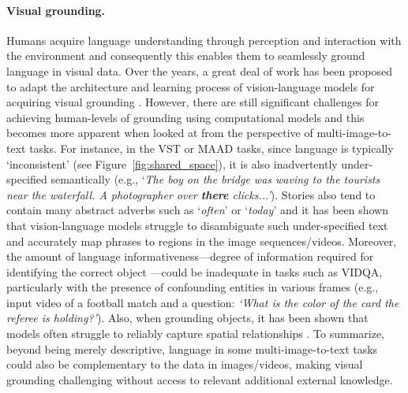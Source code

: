 \paragraph{Visual grounding.}
Humans acquire language understanding through perception and interaction with the environment \cite{vg0,lang_acquisition} and consequently this enables them to seamlessly ground language in visual data. Over the years, a great deal of work has been proposed to adapt the architecture and learning process of vision-language models for acquiring visual grounding \cite{vg1}. However, there are still significant challenges for achieving human-levels of grounding using computational models and this becomes more apparent when looked at from the perspective of multi-image-to-text tasks. For instance, in the \color{xkcdVividBlue}VST \color{black} or \color{xkcdVividBlue}MAAD \color{black} tasks, since language is typically `inconsistent' (see Figure~\ref{fig:shared_space}), it is also inadvertently under-specified semantically \cite{semantic_underspecification} (e.g., `\textit{The boy on the bridge was waving to the tourists near the waterfall. A photographer over \color{red}\textbf{there} \color{black} clicks...'}). Stories also tend to contain many abstract adverbs such as `\textit{often}' or `\textit{today}' and it has been shown that vision-language models struggle to disambiguate such under-specified text and accurately map phrases to regions in the image sequences/videos. Moreover, the amount of language informativeness---degree of information required for identifying the correct object \cite{vg2}---could be inadequate in tasks such as \color{xkcdVividBlue}VIDQA\color{black}, particularly with the presence of confounding entities in various frames (e.g., input video of a football match and a question: \textit{`What is the color of the card the referee is holding?'}). Also, when grounding objects, it has been shown that models often struggle to reliably capture spatial relationships \cite{vg3}. To summarize, beyond being merely descriptive, language in some multi-image-to-text tasks could also be complementary to the data in images/videos, making visual grounding challenging without access to relevant additional external knowledge.


